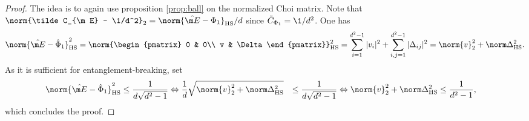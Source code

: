 \begin{proof}
The idea is to again use proposition \ref{prop:ball} on the normalized Choi matrix. Note that $\norm{\tilde C_{\m E} - \1/d^2}_2 = \norm{\hat{\m E}- \Phi_1}_\text{HS}/d$ since $\tilde C_{\Phi_1} = \1/d^2$. One has
\begin{align*}
    \norm{\hat{\m E}- \hat \Phi_1}_\text{HS} ^2 = \norm{\begin{pmatrix}
        0 & 0\\ 
        v & \Delta
    \end{pmatrix}}_\text{HS}^2  = \sum_{i=1}^{d^2-1}|v_i|^2 + \sum_{i,j = 1}^{d^2-1} \vert \Delta_{ij}\vert^2 = \norm{v}_2^2 + \norm \Delta_\text{HS}^2.
\end{align*}
As it is sufficient for entanglement-breaking, set 
\begin{align*}
    \norm{\hat{\m E}- \hat \Phi_1}_\text{HS} ^2 &\leq \frac{1}{d\sqrt{d^2-1}}
    \Leftrightarrow \frac{1}{d} \sqrt{\norm{v}_2^2 + \norm \Delta_\text{HS}^2} &\leq \frac{1}{d\sqrt{d^2-1}} \Leftrightarrow
    \norm{v}_2^2 + \norm \Delta_\text{HS}^2 &\leq \frac{1}{d^2-1},
\end{align*}
which concludes the proof.
\end{proof}

